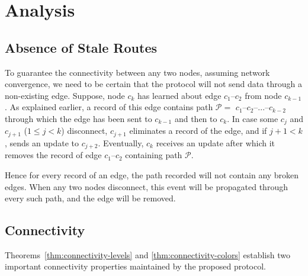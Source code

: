 \documentclass[conference]{IEEEtran}
\theoremstyle{definition}
\newcommand{\cP}{{\mathcal{P}}}
\begin{document}
\section{Analysis}
\label{sec:analysis}

\subsection{Absence of Stale Routes}
\label{sec:analysis:staleroutes}

To guarantee the connectivity between any two nodes, assuming network convergence, we need to be certain that the protocol will not send data through a non-existing edge. Suppose, node $c_k$ has learned about edge $c_1$--$c_2$ from node $c_{k-1}$. As explained earlier, a record of this edge contains path $\cP = $ $c_1$--$c_2$--...--$c_{k-2}$ through which the edge has been sent to $c_{k-1}$ and then to $c_k$. In case some $c_j$ and $c_{j+1}$ ($1 \le j < k$) disconnect, $c_{j+1}$ eliminates a record of the edge, and if $j+1 < k$, sends an update to $c_{j+2}$. Eventually, $c_k$ receives an update after which it removes the record of edge $c_1$--$c_2$ containing path $\cP$.

Hence for every record of an edge, the path recorded will not contain any broken edges. When any two nodes disconnect, this event will be propagated through every such path, and the edge will be removed.


\subsection{Connectivity}
\label{sec:analysis:connectivity}

Theorems~\ref{thm:connectivity-levels} and \ref{thm:connectivity-colors} establish 
two important connectivity properties maintained by the proposed protocol.
\end{document}
